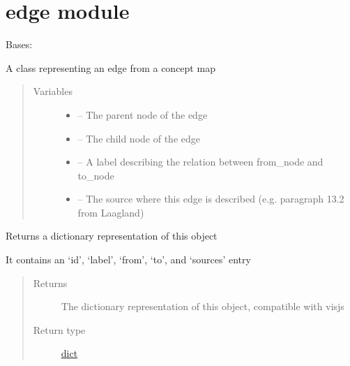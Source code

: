 \documentclass[letterpaper,10pt,english]{sphinxmanual}
\begin{document}
\section{edge module}
\label{\detokenize{edge:module-edge}}\label{\detokenize{edge:edge-module}}\label{\detokenize{edge::doc}}

\begin{fulllineitems}
\label{\detokenize{edge:edge.Edge}}
Bases: 

A class representing an edge from a concept map
\begin{quote}\begin{description}
\item[{Variables}] \leavevmode\begin{itemize}
\item {} 
 -- The parent node of the edge

\item {} 
 -- The child node of the edge

\item {} 
 -- A label describing the relation between from\_node and to\_node

\item {} 
 -- The source where this edge is described (e.g. paragraph 13.2 from Laagland)

\end{itemize}

\end{description}\end{quote}

\begin{fulllineitems}
\label{\detokenize{edge:edge.Edge.to_dict}}
Returns a dictionary representation of this object

It contains an `id', `label', `from', `to', and `sources' entry
\begin{quote}\begin{description}
\item[{Returns}] \leavevmode
The dictionary representation of this object, compatible with visjs

\item[{Return type}] \leavevmode
\href{https://docs.python.org/2/library/stdtypes.html\#dict}{dict}

\end{description}\end{quote}

\end{fulllineitems}


\end{fulllineitems}
\end{document}
